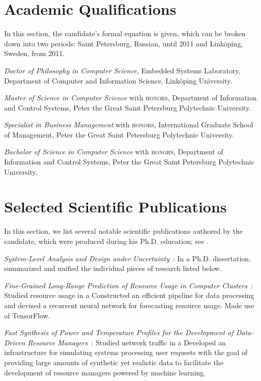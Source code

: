 \documentclass[journal]{IEEEtran}
\begin{document}
\section{Academic Qualifications} 

In this section, the candidate's formal equation is given, which can be broken
down into two periods: Saint Petersburg, Russian, until 2011 and Linköping,
Sweden, from 2011.

\date{2017} \emph{Doctor of Philosophy in Computer Science}, Embedded Systems
Laboratory, Department of Computer and Information Science, Linköping
University.

\date{2010} \emph{Master of Science in Computer Science} with \textsc{honors},
Department of Information and Control Systems, Peter the Great Saint Petersburg
Polytechnic University.

\date{2010} \emph{Specialist in Business Management} with \textsc{honors},
International Graduate School of Management, Peter the Great Saint Petersburg
Polytechnic University.

\date{2008} \emph{Bachelor of Science in Computer Science} with \textsc{honors},
Department of Information and Control Systems, Peter the Great Saint Petersburg
Polytechnic University.

\section{Selected Scientific Publications} 

In this section, we list several notable scientific publications authored by the
candidate, which were produced during his Ph.D. education; see .

\date{2017} \emph{System-Level Analysis and Design under
Uncertainty}~\cite{ukhov2017d}: In a Ph.D. dissertation, summarized and
unified the individual pieces of research listed below.

\date{2017} \emph{Fine-Grained Long-Range Prediction of Resource Usage in
Computer Clusters}~\cite{ukhov2017b}: Studied resource usage in a
 Constructed
an efficient pipeline for data processing and devised a recurrent neural network
for forecasting resource usage. Made use of TensorFlow.

\date{2017} \emph{Fast Synthesis of Power and Temperature Profiles for the
Development of Data-Driven Resource Managers}~\cite{ukhov2017c}: Studied network
traffic in a 
Developed an infrastructure for simulating systems processing user requests with
the goal of providing large amounts of synthetic yet realistic data to
facilitate the development of resource managers powered by machine learning.
\end{document}
